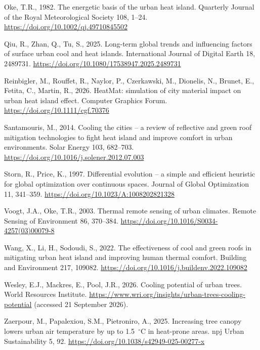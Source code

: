 \documentclass[preprint,12pt,authoryear]{elsarticle}
\begin{document}
\begin{thebibliography}{}
Oke, T.R., 1982. The energetic basis of the urban heat island. Quarterly
Journal of the Royal Meteorological Society 108, 1--24.
\url{https://doi.org/10.1002/qj.49710845502}

Qiu, R., Zhan, Q., Tu, S., 2025. Long-term global trends and influencing
factors of surface urban cool and heat islands. International Journal of
Digital Earth 18, 2489731.
\url{https://doi.org/10.1080/17538947.2025.2489731}

Reinbigler, M., Rouffet, R., Naylor, P., Czerkawski, M., Dionelis, N.,
Brunet, E., Fetita, C., Martin, R., 2026. HeatMat: simulation of city
material impact on urban heat island effect. Computer Graphics Forum.
\url{https://doi.org/10.1111/cgf.70376}

Santamouris, M., 2014. Cooling the cities -- a review of reflective and
green roof mitigation technologies to fight heat island and improve
comfort in urban environments. Solar Energy 103, 682--703.
\url{https://doi.org/10.1016/j.solener.2012.07.003}

Storn, R., Price, K., 1997. Differential evolution -- a simple and
efficient heuristic for global optimization over continuous spaces.
Journal of Global Optimization 11, 341--359.
\url{https://doi.org/10.1023/A:1008202821328}

Voogt, J.A., Oke, T.R., 2003. Thermal remote sensing of urban climates.
Remote Sensing of Environment 86, 370--384.
\url{https://doi.org/10.1016/S0034-4257(03)00079-8}

Wang, X., Li, H., Sodoudi, S., 2022. The effectiveness of cool and green
roofs in mitigating urban heat island and improving human thermal
comfort. Building and Environment 217, 109082.
\url{https://doi.org/10.1016/j.buildenv.2022.109082}

Wesley, E.J., Mackres, E., Pool, J.R., 2026. Cooling potential of urban
trees. World Resources Institute.
\url{https://www.wri.org/insights/urban-trees-cooling-potential}
(accessed 21 September 2026).

Zaerpour, M., Papalexiou, S.M., Pietroniro, A., 2025. Increasing tree
canopy lowers urban air temperature by up to 1.5~$^{\circ}$C in heat-prone
areas. npj Urban Sustainability 5, 92.
\url{https://doi.org/10.1038/s42949-025-00277-x}


\end{thebibliography}
\end{document}
